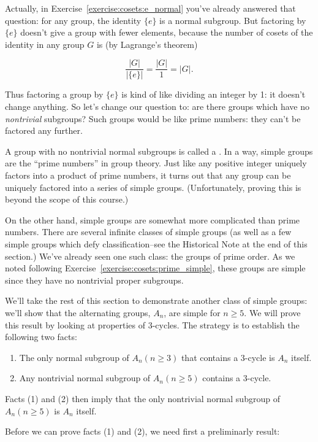 {Actually, in Exercise~\ref{exercise:cosets:e_normal} you've already answered that question: for any group, the identity $\{e\}$ is a normal subgroup.  But factoring by $\{e\}$ doesn't give a group with fewer elements, because the number of cosets of the identity in any group $G$ is (by Lagrange's theorem)

\[ \frac{|G|}{|\{e\}|} = \frac{|G|}{1} = |G|. \]

\noindent
Thus factoring a group by $\{e\}$ is kind of like dividing an integer by 1: it doesn't change anything. So let's change our question to:  are there groups which have no \emph{nontrivial} subgroups? Such groups would be like prime numbers: they can't be factored any further.

A group with no nontrivial normal subgroups is called a . In a way, simple groups are the ``prime  numbers'' in group theory. Just like any positive integer uniquely factors into a product of prime numbers,  it turns out that any group can be uniquely factored into a series of simple groups.  (Unfortunately, proving this is beyond the scope of this course.) 

On the other hand, simple groups are somewhat more complicated than prime numbers. There are several infinite classes of simple groups (as well as a few simple groups which defy classification--see the Historical Note at the end of this section.) We've already seen one such  class: the groups of prime order. As we noted following Exercise~\ref{exercise:cosets:prime_simple}, these groups are simple since they have
no nontrivial proper subgroups. 

We'll take the rest of this section to demonstrate another class of simple groups: we'll show that the alternating groups, $A_n$, are simple for
$n \geq 5$. We will prove this result by looking at properties of 3-cycles. The strategy is to establish the following two facts:
\begin{enumerate}[(1)]
\item
The only  normal subgroup of $A_n (n \geq 3)$ that contains a 3-cycle is $A_n$ itself.
\item
Any nontrivial normal subgroup of $A_n (n \geq 5)$ contains a 3-cycle.
\end{enumerate}
Facts (1) and (2) then imply that the only nontrivial normal subgroup of $A_n (n \geq 5)$ is $A_n$ itself.

Before we can prove facts (1) and (2), we need first a preliminarly result: 

}
